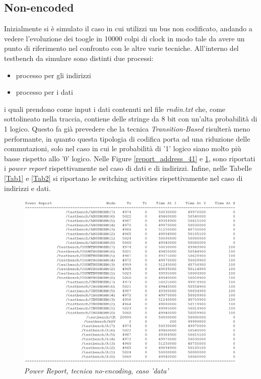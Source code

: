 \subsection{Non-encoded}
Inizialmente si è simulato il caso in cui utilizzi un bus non codificato, andando a vedere l'evoluzione dei toogle in 10000 colpi di clock in modo tale da avere un punto di riferimento nel confronto con le altre varie tecniche. All'interno del testbench da simulare sono distinti due processi:
\begin{itemize}
	\item processo per gli indirizzi
	\item processo per i dati
\end{itemize}
i quali prendono come input i dati contenuti nel file \textit{rndin.txt} che, come sottolineato nella traccia, contiene delle stringe da 8 bit con un'alta probabilità di 1 logico. Questo fa già prevedere che la tecnica \textit{Transition-Based} risulterà meno performante, in quanto questa tipologia di codifica porta ad una riduzione delle commutazioni, solo nel caso in cui le probabilità di '1' logico siano molto più basse rispetto allo '0' logico.
Nelle Figure \ref{report_address_41} e \ref{report_dati_41}, sono riportati i \textit{power report} rispettivamente nel caso di dati e di indirizzi. Infine, nelle Tabelle \ref{Tab1} e \ref{Tab2} si riportano le switching activities rispettivamente nel caso di indirizzi e dati.
\begin{figure}[!htb]
	\centering
	\includegraphics[scale=0.65]{immagini/4_1_data_report}
	\caption{\textit{Power Report, tecnica no-encoding, caso 'data'}}
	\label{report_dati_41}
\end{figure}
